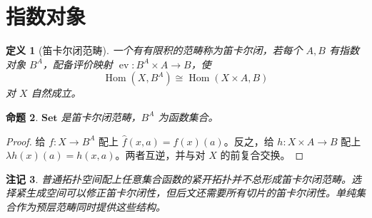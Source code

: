 \documentclass[12pt,oneside,openany,fontset=none]{ctexbook}
\theoremstyle{cn}
\newtheorem{definition}{定义}[chapter]
\newtheorem{proposition}[definition]{命题}
\newtheorem{remark}[definition]{注记}
\numberwithin{equation}{chapter}
\newcommand{\Set}{\mathbf{Set}}
\newcommand{\Hom}{\operatorname{Hom}}
\newcommand{\ev}{\operatorname{ev}}
\begin{document}
\section{指数对象}
\begin{definition}[笛卡尔闭范畴]
一个有有限积的范畴称为笛卡尔闭，若每个 $A,B$ 有指数对象 $B^A$，配备评价映射 $\ev:B^A\times A\to B$，使
\[
\Hom(X,B^A)\cong\Hom(X\times A,B)
\]
对 $X$ 自然成立。
\end{definition}
\begin{proposition}
$\Set$ 是笛卡尔闭范畴，$B^A$ 为函数集合。
\end{proposition}
\begin{proof}
给 $f:X\to B^A$ 配上 $\widehat f(x,a)=f(x)(a)$。反之，给 $h:X\times A\to B$ 配上 $\lambda h(x)(a)=h(x,a)$。两者互逆，并与对 $X$ 的前复合交换。
\end{proof}
\begin{remark}
普通拓扑空间配上任意集合函数的紧开拓扑并不总形成笛卡尔闭范畴。选择紧生成空间可以修正笛卡尔闭性，但后文还需要所有切片的笛卡尔闭性。单纯集合作为预层范畴同时提供这些结构。
\end{remark}
\end{document}
